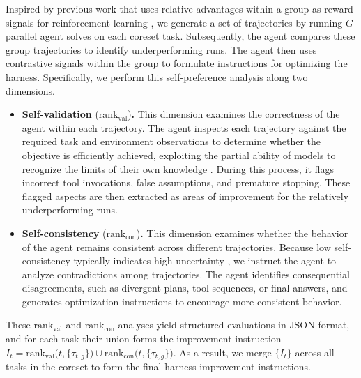 \documentclass{llmxive}
\begin{document}
Inspired by previous work that uses relative advantages within a group as reward signals for reinforcement learning \citep{shao2024deepseekmath}, we generate a set of trajectories by running $G$ parallel agent solves on each coreset task.
Subsequently, the agent compares these group trajectories to identify underperforming runs.
The agent then uses contrastive signals within the group to formulate instructions for optimizing the harness.
Specifically, we perform this self-preference analysis along two dimensions.
\begin{itemize}
    \item {} \textbf{Self-validation} ($\mathrm{rank}_{\mathrm{val}}$)\textbf{.} This dimension examines the correctness of the agent within each trajectory.
    The agent inspects each trajectory against the required task and environment observations to determine whether the objective is efficiently achieved, exploiting the partial ability of models to recognize the limits of their own knowledge \citep{pan2025refusal}.
    During this process, it flags incorrect tool invocations, false assumptions, and premature stopping. These flagged aspects are then extracted as areas of improvement for the relatively underperforming runs.
    \item {} \textbf{Self-consistency} ($\mathrm{rank}_{\mathrm{con}}$)\textbf{.} This dimension examines whether the behavior of the agent remains consistent across different trajectories.
    Because low self-consistency typically indicates high uncertainty \citep{wang2022selfconsistency,farquhar2024semantic}, we instruct the agent to analyze contradictions among trajectories.
    The agent identifies consequential disagreements, such as divergent plans, tool sequences, or final answers, and generates optimization instructions to encourage more consistent behavior.
\end{itemize}
These $\mathrm{rank}_{\mathrm{val}}$ and $\mathrm{rank}_{\mathrm{con}}$ analyses yield structured evaluations in JSON format, and for each task their union forms the improvement instruction $I_t = \mathrm{rank}_{\mathrm{val}}\bigl(t, \{\tau_{t,g}\}\bigr) \cup \mathrm{rank}_{\mathrm{con}}\bigl(t, \{\tau_{t,g}\}\bigr)$.
As a result, we merge $\{I_t\}$ across all tasks in the coreset to form the final harness improvement instructions.
\end{document}
